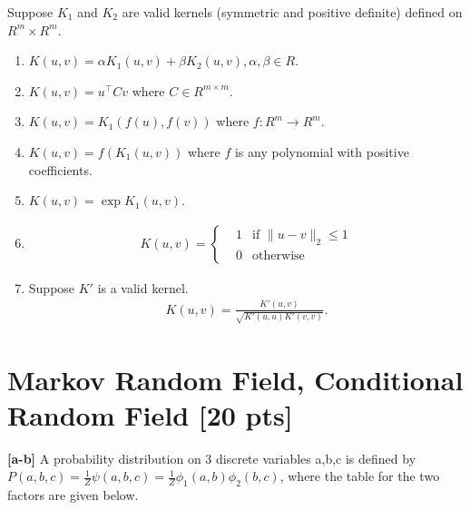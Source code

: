 \documentclass[twoside,11pt]{article}\usepackage{amsmath,amsfonts,amsthm,fullpage}
\begin{document}
 Suppose $K_1$ and $K_2$ are valid kernels (symmetric and positive definite) defined on $R^m\times R^m$.
\begin{enumerate}
\item $K(u,v) = \alpha K_1(u,v) + \beta K_2(u,v), \alpha,\beta\in R$.
\item $K(u,v) = u^\top C v$ where $C\in R^{m\times m}$.
\item $K(u,v) = K_1(f(u), f(v))$ where $f:R^m \rightarrow R^m$.
\item $K(u,v) = f(K_1(u,v))$ where $f$ is any polynomial with positive coefficients.
\item $K(u,v) = \exp{K_1(u,v)}$.
\item \begin{align}
	K(u,v) = \left\{
	\begin{aligned}
	&1 & \text{if } \|u-v\|_2 \leqslant 1\\
	& 0 & \text{otherwise}
	\end{aligned}
	\right.
	\end{align}
	
\item Suppose $K'$ is a valid kernel. 
	\begin{align}
	K(u,v) = \frac{K'(u,v)}{\sqrt{K'(u,u)K'(v,v)}}.
	\end{align}
	
\end{enumerate} 
 
 

\section{Markov Random Field, Conditional Random Field [20 pts]}

\textbf{[a-b]} A probability distribution on  3 discrete variables
a,b,c is defined by $P(a,b,c) = \frac{1}{Z}\psi(a,b,c) =
\frac{1}{Z}\phi_1(a,b)\phi_2(b,c)$, where the table for the two
factors are given below.
\end{document}
